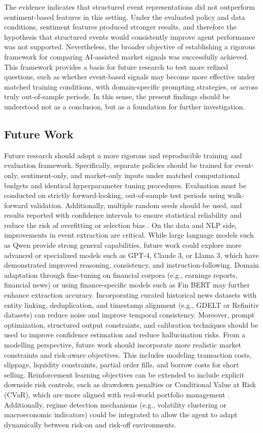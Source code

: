 \documentclass[a4paper,fleqn]{cas-sc}
\begin{document}
The evidence indicates that structured event representations did not outperform sentiment-based features in this setting. Under the evaluated policy and data conditions, sentiment features produced stronger results, and therefore the hypothesis that structured events would consistently improve agent performance was not supported. Nevertheless, the broader objective of establishing a rigorous framework for comparing AI-assisted market signals was successfully achieved. This framework provides a basis for future research to test more refined questions, such as whether event-based signals may become more effective under matched training conditions, with domain-specific prompting strategies, or across truly out-of-sample periods. In this sense, the present findings should be understood not as a conclusion, but as a foundation for further investigation.
\subsection{Future Work}\label{sec:FutureWork}
Future research should adopt a more rigorous and reproducible training and evaluation framework. Specifically, separate policies should be trained for event-only, sentiment-only, and market-only inputs under matched computational budgets and identical hyperparameter tuning procedures. Evaluation must be conducted on strictly forward-looking, out-of-sample test periods using walk-forward validation. Additionally, multiple random seeds should be used, and results reported with confidence intervals to ensure statistical reliability and reduce the risk of overfitting or selection bias \cite{bailey2017pbo}.
On the data and NLP side, improvements in event extraction are critical. While large language models such as Qwen provide strong general capabilities, future work could explore more advanced or specialized models such as GPT-4, Claude 3, or Llama 3, which have demonstrated improved reasoning, consistency, and instruction-following. Domain adaptation through fine-tuning on financial corpora (e.g., earnings reports, financial news) or using finance-specific models such as Fin	BERT may further enhance extraction accuracy. Incorporating curated historical news datasets with entity linking, deduplication, and timestamp alignment (e.g., GDELT or Refinitiv datasets) can reduce noise and improve temporal consistency. Moreover, prompt optimization, structured output constraints, and calibration techniques should be used to improve confidence estimation and reduce hallucination risks.
From a modelling perspective, future work should incorporate more realistic market constraints and risk-aware objectives. This includes modeling transaction costs, slippage, liquidity constraints, partial order fills, and borrow costs for short selling. Reinforcement learning objectives can be extended to include explicit downside risk controls, such as drawdown penalties or Conditional Value at Risk (CVaR), which are more aligned with real-world portfolio management \cite{rockafellar2000optimization}. Additionally, regime detection mechanisms (e.g., volatility clustering or macroeconomic indicators) could be integrated to allow the agent to adapt dynamically between risk-on and risk-off environments.
\end{document}
